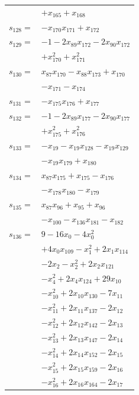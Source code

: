 \begin{longtable}{@{}r@{\;}l@{}}
 & \(\displaystyle +x_{165} +x_{168}\) \\[3pt]
\(s_{128}=\) & \(\displaystyle -x_{170}x_{171} +x_{172}\) \\[3pt]
\(s_{129}=\) & \(\displaystyle -1 -2x_{89}x_{172} -2x_{90}x_{172}\) \\
 & \(\displaystyle +x_{170}^{2} +x_{171}^{2}\) \\[3pt]
\(s_{130}=\) & \(\displaystyle x_{87}x_{170} -x_{88}x_{173} +x_{170}\) \\
 & \(\displaystyle -x_{171} -x_{174}\) \\[3pt]
\(s_{131}=\) & \(\displaystyle -x_{175}x_{176} +x_{177}\) \\[3pt]
\(s_{132}=\) & \(\displaystyle -1 -2x_{89}x_{177} -2x_{90}x_{177}\) \\
 & \(\displaystyle +x_{175}^{2} +x_{176}^{2}\) \\[3pt]
\(s_{133}=\) & \(\displaystyle -x_{19} -x_{19}x_{128} -x_{19}x_{129}\) \\
 & \(\displaystyle -x_{19}x_{179} +x_{180}\) \\[3pt]
\(s_{134}=\) & \(\displaystyle x_{87}x_{175} +x_{175} -x_{176}\) \\
 & \(\displaystyle -x_{178}x_{180} -x_{179}\) \\[3pt]
\(s_{135}=\) & \(\displaystyle x_{87}x_{96} +x_{95} +x_{96}\) \\
 & \(\displaystyle -x_{100} -x_{136}x_{181} -x_{182}\) \\[3pt]
\(s_{136}=\) & \(\displaystyle 9 -16x_{0} -4x_{0}^{2}\) \\
 & \(\displaystyle +4x_{0}x_{109} -x_{1}^{2} +2x_{1}x_{114}\) \\
 & \(\displaystyle -2x_{2} -x_{2}^{2} +2x_{2}x_{121}\) \\
 & \(\displaystyle -x_{4}^{2} +2x_{4}x_{124} +29x_{10}\) \\
 & \(\displaystyle -x_{10}^{2} +2x_{10}x_{130} -7x_{11}\) \\
 & \(\displaystyle -x_{11}^{2} +2x_{11}x_{137} -2x_{12}\) \\
 & \(\displaystyle -x_{12}^{2} +2x_{12}x_{142} -2x_{13}\) \\
 & \(\displaystyle -x_{13}^{2} +2x_{13}x_{147} -2x_{14}\) \\
 & \(\displaystyle -x_{14}^{2} +2x_{14}x_{152} -2x_{15}\) \\
 & \(\displaystyle -x_{15}^{2} +2x_{15}x_{159} -2x_{16}\) \\
 & \(\displaystyle -x_{16}^{2} +2x_{16}x_{164} -2x_{17}\) \\

\end{longtable}
